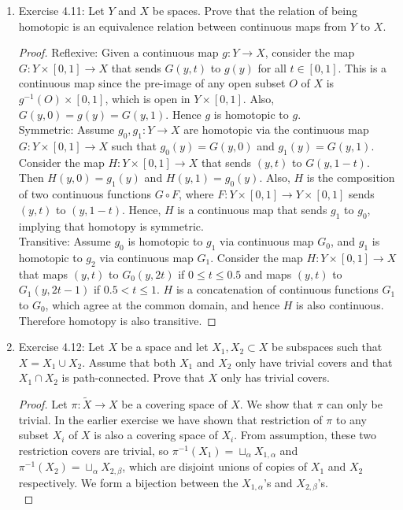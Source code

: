\documentclass{article}
\begin{document}
\begin{enumerate}
  \item Exercise 4.11: Let $Y$ and $X$ be spaces. Prove that the relation
    of being homotopic is an equivalence relation between continuous maps
    from $Y$ to $X$.
    \begin{proof}
      Reflexive: Given a continuous map $g:Y\rightarrow X$, consider the
      map $G:Y\times[0,1]\rightarrow X$ that sends $G(y,t)$ to $g(y)$ for
      all $t\in[0,1]$. This is a continuous map since the pre-image of
      any open subset $O$ of $X$ is $g^{-1}(O)\times[0,1]$, which is open
      in $Y\times[0,1]$. Also, $G(y,0)=g(y)=G(y,1)$. Hence $g$ is homotopic
      to $g$. \\

      Symmetric: Assume $g_0,g_1:Y\rightarrow X$ are homotopic via the
      continuous map $G:Y\times[0,1]\rightarrow X$ such that
      $g_0(y)=G(y,0)$ and $g_1(y)=G(y,1)$. Consider the map
      $H:Y\times[0,1]\rightarrow X$ that sends $(y,t)$ to $G(y,1-t)$. Then
      $H(y,0)=g_1(y)$ and $H(y,1)=g_0(y)$. Also, $H$ is the composition of
      two continuous functions $G\circ F$, where $F:Y\times[0,1]\rightarrow
      Y\times[0,1]$ sends $(y,t)$ to $(y,1-t)$. Hence, $H$ is a continuous
      map that sends $g_1$ to $g_0$, implying that homotopy is symmetric.
      \\

      Transitive: Assume $g_0$ is homotopic to $g_1$ via continuous map
      $G_0$, and $g_1$ is homotopic to $g_2$ via continuous map $G_1$.
      Consider the map $H:Y\times[0,1]\rightarrow X$ that maps $(y,t)$ to
      $G_0(y,2t)$ if $0\leq t\leq 0.5$ and maps $(y,t)$ to $G_1(y,2t-1)$ if
      $0.5<t\leq1$. $H$ is a concatenation of continuous functions $G_1$ to
      $G_0$, which agree at the common domain, and hence $H$ is also
      continuous. Therefore homotopy is also transitive.
    \end{proof}

  \item Exercise 4.12: Let $X$ be a space and let $X_1,X_2\subset X$ be
    subspaces such that $X=X_1\cup X_2$. Assume that both $X_1$ and $X_2$
    only have trivial covers and that $X_1\cap X_2$ is path-connected.
    Prove that $X$ only has trivial covers.

    \begin{proof}
      Let $\pi:\tilde{X}\rightarrow X$ be a covering space of $X$. We show
      that $\pi$ can only be trivial. In the earlier exercise we have shown
      that restriction of $\pi$ to any subset $X_i$ of $X$ is also a
      covering space of $X_i$. From assumption, these two restriction
      covers are trivial, so $\pi^{-1}(X_1)=\sqcup_{\alpha}X_{1,\alpha}$
      and $\pi^{-1}(X_2)=\sqcup_{\alpha}X_{2,\beta}$, which are disjoint
      unions of copies of $X_1$ and $X_2$ respectively. We form a bijection
      between the $X_{1,\alpha}$'s and $X_{2,\beta}$'s. \\


\end{proof}
\end{enumerate}
\end{document}
